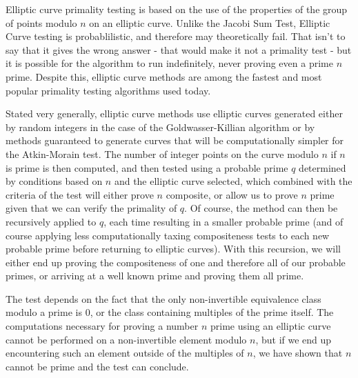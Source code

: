 \documentclass{article}
\begin{document}
Elliptic curve primality testing is based on the use of the properties of the group of points modulo $n$ on an elliptic curve. Unlike the Jacobi Sum Test, Elliptic Curve testing is probablilistic, and therefore may theoretically fail. That isn't to say that it gives the wrong answer - that would make it not a primality test - but it is possible for the algorithm to run indefinitely, never proving even a prime $n$ prime.  Despite this, elliptic curve methods are among the fastest and most popular primality testing algorithms used today.
\par Stated very generally, elliptic curve methods use elliptic curves generated either by random integers in the case of the Goldwasser-Killian algorithm or by methods guaranteed to generate curves that will be computationally simpler for the Atkin-Morain test. The number of integer points on the curve modulo $n$ if $n$ is prime is then computed, and then tested using a probable prime $q$ determined by conditions based on $n$ and the elliptic curve selected, which combined with the criteria of the test will either prove $n$ composite, or allow us to prove $n$ prime given that we can verify the primality of $q$. Of course, the method can then be recursively applied to $q$, each time resulting in a smaller probable prime (and of course applying less computationally taxing compositeness tests to each new probable prime before returning to elliptic curves). With this recursion, we will either end up proving the compositeness of one and therefore all of our probable primes, or arriving at a well known prime and proving them all prime. 
\par The test depends on the fact that the only non-invertible equivalence class modulo a prime is $0$, or the class containing multiples of the prime itself. The computations necessary for proving a number $n$ prime using an elliptic curve cannot be performed on a non-invertible element modulo $n$,  but if we end up encountering such an element outside of the multiples of $n$, we have shown that $n$ cannot be prime and the test can conclude. 

\end{document}

